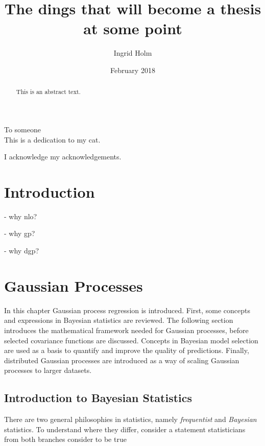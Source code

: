 \documentclass[twoside,english]{uiofysmaster}
\begin{document}
\title{The dings that will become a thesis at some point}
\author{Ingrid Holm}
\date{February 2018}

\maketitle

\begin{abstract}
This is an abstract text.
\end{abstract}

\begin{dedication}
  To someone
  \\\vspace{12pt}
  This is a dedication to my cat.
\end{dedication}

\begin{acknowledgements}
  I acknowledge my acknowledgements.
\end{acknowledgements}

\tableofcontents


\chapter{Introduction}

- why nlo?

- why gp?

- why dgp?


\chapter{Gaussian Processes}

In this chapter Gaussian process regression is introduced. First, some concepts and expressions in Bayesian statistics are reviewed. The following section introduces the mathematical framework needed for Gaussian processes, before selected covariance functions are discussed. Concepts in Bayesian model selection are used as a basis to quantify and improve the quality of predictions. Finally, distributed Gaussian processes are introduced as a way of scaling Gaussian processes to larger datasets.

\section{Introduction to Bayesian Statistics}

There are two general philosophies in statistics, namely \textit{frequentist} and \textit{Bayesian} statistics. To understand where they differ, consider a statement statisticians from both branches consider to be true
\end{document}
